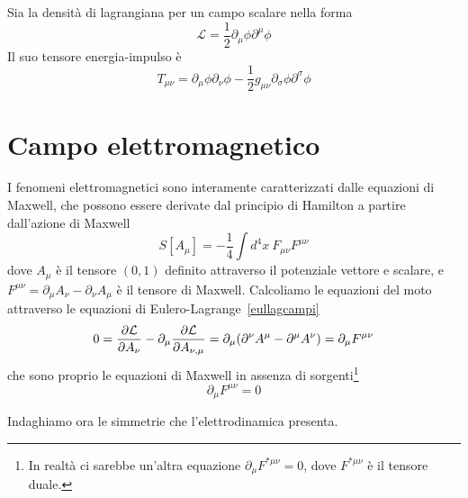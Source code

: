     \begin{example}
    Sia la densità di lagrangiana per un campo scalare nella forma
    \begin{equation*}
        \mathcal L = \frac{1}{2} \partial_\mu \phi \partial^\mu \phi
    \end{equation*}
    Il suo tensore energia-impulso è
    \begin{equation*}
        T_{\mu\nu} = \partial_\mu \phi \partial_\nu \phi - \frac{1}{2} g_{\mu\nu} \partial_\sigma \phi \partial^\sigma \phi
    \end{equation*}
    \end{example}

\section{Campo elettromagnetico}
    I fenomeni elettromagnetici sono interamente caratterizzati dalle equazioni di Maxwell, che possono essere derivate dal principio di Hamilton a partire dall'azione di Maxwell
\begin{equation} \label{azionemaxwell}
    S[A_\mu] = - \frac{1}{4} \int d^4 x ~ F_{\mu\nu} F^{\mu\nu}
\end{equation}
    dove $A_\mu$ è il tensore $(0, 1)$ definito attraverso il potenziale vettore e scalare, e $F^{\mu\nu} = \partial_\mu A_\nu - \partial_\nu A_\mu$ è il tensore di Maxwell. Calcoliamo le equazioni del moto attraverso le equazioni di Eulero-Lagrange~\eqref{eullagcampi}
\begin{equation*}
    0 = \frac{\partial\mathcal L}{\partial A_\nu} - \partial_\mu \frac{\partial\mathcal L}{\partial A_{\nu,\mu}} = \partial_\mu (\partial^\nu A^\mu - \partial^\mu A^\nu) = \partial_\mu F^{\mu\nu}
\end{equation*}
    che sono proprio le equazioni di Maxwell in assenza di sorgenti\footnote{In realtà ci sarebbe un'altra equazione $\partial_\mu F^{*\mu\nu} = 0$, dove $F^{*\mu\nu}$ è il tensore duale.}
\begin{equation}\label{eqmax}
    \partial_\mu F^{\mu\nu} = 0
\end{equation}

    Indaghiamo ora le simmetrie che l'elettrodinamica presenta.

